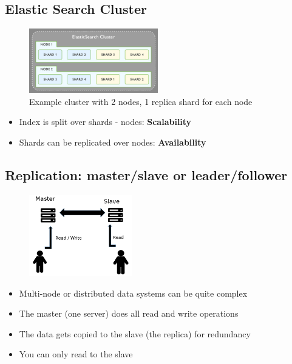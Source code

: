 \documentclass{article}
\begin{document}
\subsection{Elastic Search Cluster}

\begin{figure}[H]
    \centering
    \includegraphics[width=0.5\textwidth]{elasticsearch-cluster.png}
    \caption{Example cluster with 2 nodes, 1 replica shard for each node}
\end{figure}

\begin{itemize}
    \item Index is split over shards - nodes: \textbf{Scalability}
    \item Shards can be replicated over nodes: \textbf{Availability}
\end{itemize}

\subsection{Replication: master/slave or leader/follower}

\begin{figure}[H]
    \centering
    \includegraphics[width=0.4\textwidth]{replication-master-slave.png}
    \caption{}
\end{figure}

\begin{itemize}
    \item Multi-node or distributed data systems can be quite complex
    \item The master (one server) does all read and write operations
    \item The data gets copied to the slave (the replica) for redundancy
    \item You can only read to the slave 
\end{itemize}
\end{document}
